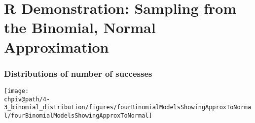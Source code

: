 \documentclass[slidestop,compress,mathserif]{beamer}
\makeatletter
\def\chpiv@path{../../Chp 4}
\makeatother
\begin{document}

\section{R Demonstration: Sampling from the Binomial, Normal Approximation}








\begin{frame}
\frametitle{Distributions of number of successes}


\begin{center}
\texttt{[image: \\chpiv@path/4-3\_binomial\_distribution/figures/fourBinomialModelsShowingApproxToNormal/fourBinomialModelsShowingApproxToNormal]}
\end{center}

\end{frame}
\end{document}
